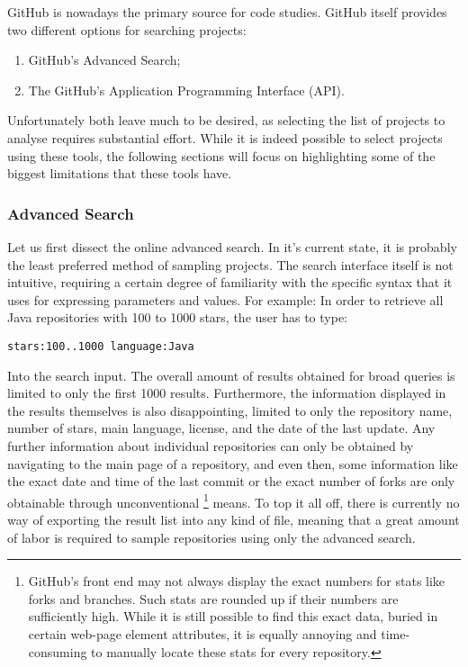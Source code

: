 GitHub is nowadays the primary source for code studies.
GitHub itself provides two different options for searching projects:
\begin{enumerate}
    \item GitHub's Advanced Search;
    \item The GitHub's Application Programming Interface (API).
\end{enumerate}
Unfortunately both leave much to be desired, as selecting the list of projects to analyse requires substantial effort.
While it is indeed possible to select projects using these tools, the following sections will focus on highlighting some of the biggest limitations that these tools have.

\subsubsection{Advanced Search}

Let us first dissect the online advanced search.
In it's current state, it is probably the least preferred method of sampling projects.
The search interface itself is not intuitive, requiring a certain degree of familiarity with the specific syntax that it uses for expressing parameters and values.
For example: In order to retrieve all Java repositories with 100 to 1000 stars, the user has to type:
\begin{verbatim}
stars:100..1000 language:Java
\end{verbatim}
Into the search input.
The overall amount of results obtained for broad queries is limited to only the first 1000 results.
Furthermore, the information displayed in the results themselves is also disappointing, limited to only the repository name, number of stars, main language, license, and the date of the last update.
Any further information about individual repositories can only be obtained by navigating to the main page of a repository, and even then, some information like the exact date and time of the last commit or the exact number of forks are only obtainable through unconventional
\footnote{GitHub’s front end may not always display the exact numbers for stats like forks and branches.
Such stats are rounded up if their numbers are sufficiently high.
While it is still possible to find this exact data, buried in certain web-page element attributes, it is equally annoying and time-consuming to manually locate these stats for every repository.} means.
To top it all off, there is currently no way of exporting the result list into any kind of file, meaning that a great amount of labor is required to sample repositories using only the advanced search.

